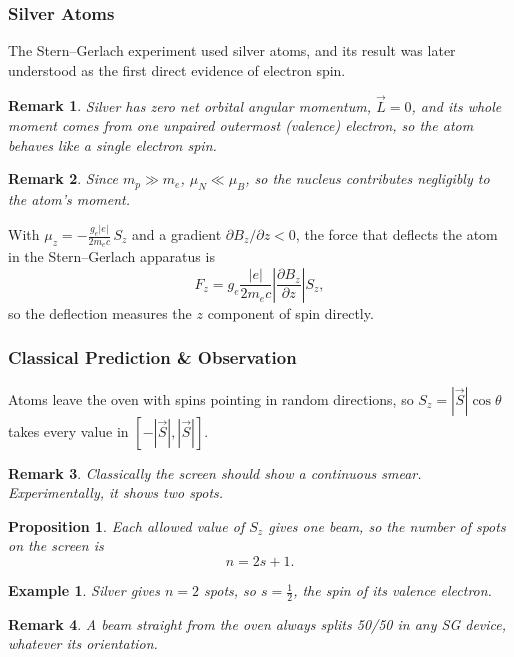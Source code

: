 \documentclass{article}
\newtheorem*{example}{Example}
\newtheorem{remark}{Remark}
\newtheorem{proposition}{Proposition}
\begin{document}
\subsubsection{Silver Atoms}
The Stern--Gerlach experiment used silver atoms, and its result was later understood as the first direct evidence of electron spin.
\begin{remark}
    Silver has zero net orbital angular momentum, $\vec{L} = 0$, and its whole moment comes from one unpaired outermost (valence) electron, so the atom behaves like a single electron spin.
\end{remark}
\begin{remark}
    Since $m_{p} \gg m_{e}$, $\mu_{N} \ll \mu_{B}$, so the nucleus contributes negligibly to the atom's moment.
\end{remark}
With $\mu_{z} = -\frac{g_{e}|e|}{2m_{e}c}\,S_{z}$ and a gradient $\partial B_{z}/\partial z < 0$, the force that deflects the atom in the Stern--Gerlach apparatus is
\[F_{z} = g_{e}\frac{|e|}{2m_{e}c}\left|\frac{\partial B_{z}}{\partial z}\right| S_{z},\]
so the deflection measures the $z$ component of spin directly.

\subsubsection{Classical Prediction \& Observation}
Atoms leave the oven with spins pointing in random directions, so $S_z = |\vec{S}|\cos\theta$ takes every value in $[-|\vec{S}|,|\vec{S}|]$.
\begin{remark}
    Classically the screen should show a continuous smear. Experimentally, it shows two spots.
\end{remark}
\begin{proposition}
    Each allowed value of $S_z$ gives one beam, so the number of spots on the screen is
    \begin{equation}
        \label{eq:number-of-beams}
        n = 2s+1.
    \end{equation}
\end{proposition}
\begin{example}
    Silver gives $n = 2$ spots, so $s = \tfrac12$, the spin of its valence electron.
\end{example}
\begin{remark}
    A beam straight from the oven always splits 50/50 in any SG device, whatever its orientation.
\end{remark}
\end{document}
